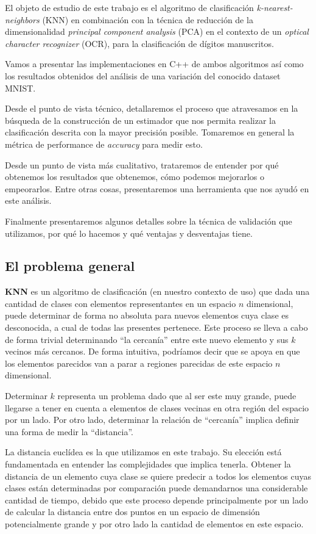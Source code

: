 El objeto de estudio de este trabajo es el algoritmo de clasificación \textit{k-nearest-neighbors} (KNN) en combinación con la técnica de reducción de la dimensionalidad \textit{principal component analysis} (PCA) en el contexto de un \textit{optical character recognizer} (OCR), para la clasificación de dígitos manuscritos.

Vamos a presentar las implementaciones en C++ de ambos algoritmos así como los resultados obtenidos del análisis de una variación del conocido dataset MNIST.

Desde el punto de vista técnico, detallaremos el proceso que atravesamos en la búsqueda de la construcción de un estimador que nos permita realizar la clasificación descrita con la mayor precisión posible. Tomaremos en general la métrica de performance de \textit{accuracy} para medir esto.

Desde un punto de vista más cualitativo, trataremos de entender por qué obtenemos los resultados que obtenemos, cómo podemos mejorarlos o empeorarlos. Entre otras cosas, presentaremos una herramienta que nos ayudó en este análisis.

Finalmente presentaremos algunos detalles sobre la técnica de validación que utilizamos, por qué lo hacemos y qué ventajas y desventajas tiene.

\subsection{El problema general}

\textbf{KNN} es un algoritmo de clasificación (en nuestro contexto de uso) que dada una cantidad de clases con elementos representantes en un espacio $n$ dimensional, puede determinar de forma no absoluta para nuevos elementos cuya clase es desconocida, a cual de todas las presentes pertenece. Este proceso se lleva a cabo de forma trivial determinando ``la cercanía'' entre este nuevo elemento y sus $k$ vecinos más cercanos. De forma intuitiva, podríamos decir que se apoya en que los elementos parecidos van a parar a regiones parecidas de este espacio $n$ dimensional.

Determinar $k$ representa un problema dado que al ser este muy grande, puede llegarse a tener en cuenta a elementos de clases vecinas en otra región del espacio por un lado. Por otro lado, determinar la relación de ``cercanía'' implica definir una forma de medir la ``distancia''.

La distancia euclídea es la que utilizamos en este trabajo. Su elección está fundamentada en entender las complejidades que implica tenerla. Obtener la distancia de un elemento cuya clase se quiere predecir a todos los elementos cuyas clases están determinadas por comparación puede demandarnos una considerable cantidad de tiempo, debido que este proceso depende principalmente por un lado de calcular la distancia entre dos puntos en un espacio de dimensión potencialmente grande y por otro lado la cantidad de elementos en este espacio.

